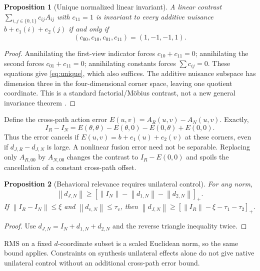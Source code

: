 \documentclass[10pt,a4paper]{article}
\newtheorem{proposition}{Proposition}[section]
\newcommand{\norm}[1]{\left\|#1\right\|}
\newcommand{\pos}[1]{\left[#1\right]_+}
\begin{document}
\begin{proposition}[Unique normalized linear invariant]
A linear contrast $\sum_{i,j\in\{0,1\}}c_{ij}A_{ij}$ with $c_{11}=1$ is
invariant to every additive nuisance $b+e_1(i)+e_2(j)$ if and only if
\begin{equation}\label{eq:unique}
 (c_{00},c_{10},c_{01},c_{11})=(1,-1,-1,1).
\end{equation}
\end{proposition}
\begin{proof}
Annihilating the first-view indicator forces $c_{10}+c_{11}=0$; annihilating
the second forces $c_{01}+c_{11}=0$; annihilating constants forces
$\sum c_{ij}=0$. These equations give \eqref{eq:unique}, which also suffices.
The additive nuisance subspace has dimension three in the four-dimensional
corner space, leaving one quotient coordinate. This is a standard
factorial/M\"obius contrast, not a new general invariance theorem \cite{rota}.
\end{proof}

Define the cross-path action error $E(u,v)=A_R(u,v)-A_N(u,v)$. Exactly,
\begin{equation}\label{eq:errorcontrast}
 I_R-I_N=E(\theta,\theta)-E(\theta,0)-E(0,\theta)+E(0,0).
\end{equation}
Thus the error cancels if $E(u,v)=b+e_1(u)+e_2(v)$ at these corners, even if
$d_{J,R}-d_{J,N}$ is large. A nonlinear fusion error need not be separable.
Replacing only $A_{R,00}$ by $A_{N,00}$ changes the contrast to
$I_R-E(0,0)$ and spoils the cancellation of a constant cross-path offset.

\begin{proposition}[Behavioral relevance requires unilateral control]
For any norm,
\begin{equation}\label{eq:jointbound}
 \norm{d_{J,N}}\geq\pos{\norm{I_N}-\norm{d_{1,N}}-\norm{d_{2,N}}}.
\end{equation}
If $\norm{I_R-I_N}\leq\xi$ and $\norm{d_{v,N}}\leq\tau_v$, then
$\norm{d_{J,N}}\geq\pos{\norm{I_R}-\xi-\tau_1-\tau_2}$.
\end{proposition}
\begin{proof}
Use $d_{J,N}=I_N+d_{1,N}+d_{2,N}$ and the reverse triangle inequality twice.
\end{proof}
RMS on a fixed $d$-coordinate subset is a scaled Euclidean norm, so the same
bound applies. Constraints on synthesis unilateral effects alone do not give
native unilateral control without an additional cross-path error bound.
\end{document}
